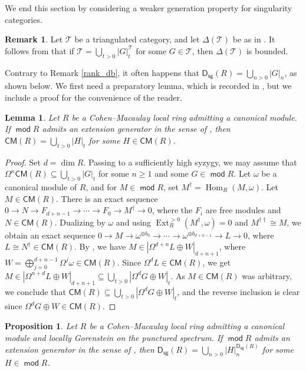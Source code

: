 \documentclass[10pt]{amsart}
\newtheorem{lem}[thm]{Lemma}
\newtheorem{prop}[thm]{Proposition}
\theoremstyle{definition}
\newtheorem{rem}[thm]{Remark}
\theoremstyle{remark}
\numberwithin{equation}{thm}
\def\CM{\mathsf{CM}}
\def\dim{\operatorname{dim}}
\def\ds{\operatorname{\mathsf{D_{sg}}}}
\def\Ext{\operatorname{Ext}}
\def\ge{\geqslant}
\def\Hom{\operatorname{Hom}}
\def\mod{\operatorname{\mathsf{mod}}}
\def\syz{\Omega}
\def\T{\mathcal{T}}
\begin{document}
We end this section by considering a weaker generation property for singularity categories.
\begin{rem}\label{entropy} 
Let $\T$ be a triangulated category, and let $\Delta(\T)$ be as in \cite[Definition 2.9]{AIT}. 
It follows from \cite[Lemma 2.11]{AIT} that if $\T=\bigcup_{t>0}{|G|}_{t}^{\T}$ for some $G\in\T$, then $\Delta(\T)$ is bounded. 
\end{rem} 
Contrary to Remark \ref{rank_db}, it often happens that $\ds(R)=\bigcup_{n>0}{|G|}_{n}$, as shown below. 
We first need a preparatory lemma, which is recorded in \cite[Remark 4.5(2)]{AIT}, but we include a proof for the convenience of the reader. 
\begin{lem}\label{cmextlem} 
Let $R$ be a Cohen--Macaulay local ring admitting a canonical module. 
If $\mod R$ admits an extension generator in the sense of \cite{DLMO}, then $\CM(R)=\bigcup_{t>0}{|H|}_{t}$ for some $H\in\CM(R)$. 
\end{lem} 
\begin{proof} 
Set $d=\dim R$. 
Passing to a sufficiently high syzygy, we may assume that $\syz^n\CM(R)\subseteq\bigcup_{t>0}{|G|}_{t}$ for some $n\ge1$ and some $G\in\mod R$. 
Let $\omega$ be a canonical module of $R$, and for $M\in\mod R$, set $M^{\dagger}=\Hom_R(M,\omega)$. 
Let $M\in\CM(R)$. There is an exact sequence $0\to N\to F_{d+n-1}\to\cdots\to F_0\to M^{\dagger}\to0$, where the $F_i$ are free modules and $N\in\CM(R)$. 
Dualizing by $\omega$ and using $\Ext_R^{>0}(M^{\dagger},\omega)=0$ and $M^{\dagger\dagger}\cong M$, we obtain an exact sequence $0\to M\to\omega^{\oplus b_0}\to\cdots\to\omega^{\oplus b_{d+n-1}}\to L\to0$, where $L\cong N^{\dagger}\in\CM(R)$. 
By \cite[Lemma 5.8]{DT2014}, we have $M\in{|\syz^{d+n}L\oplus W|}_{d+n+1}$, where $W=\bigoplus_{j=0}^{d+n-1}\syz^j\omega\in\CM(R)$. 
Since $\syz^{d}L\in\CM(R)$, we get $M\in{|\syz^{n+d}L\oplus W|}_{d+n+1}\subseteq\bigcup_{t>0}{|\syz^{d}G\oplus W|}_{t}$. 
As $M\in\CM(R)$ was arbitrary, we conclude that $\CM(R)\subseteq\bigcup_{t>0}{|\syz^{d}G\oplus W|}_{t}$, and the reverse inclusion is clear since $\syz^{d}G\oplus W\in\CM(R)$. 
\end{proof}
\begin{prop}\label{extdsg} 
Let $R$ be a Cohen--Macaulay local ring admitting a canonical module and locally Gorenstein on the punctured spectrum. 
If $\mod R$ admits an extension generator in the sense of \cite{DLMO}, then $\ds(R)=\bigcup_{n>0}{|H|}_{n}^{\ds(R)}$ for some $H\in\mod R$. 
\end{prop} 
\end{document}
